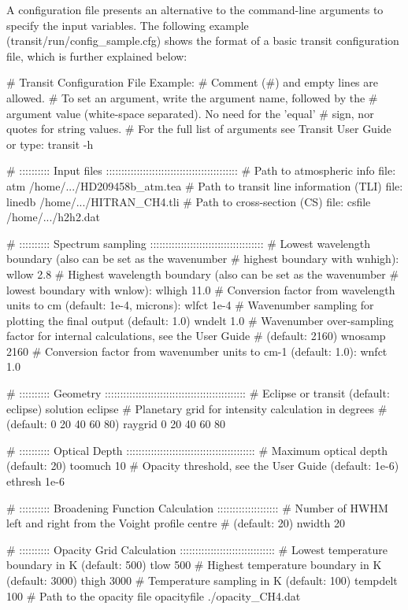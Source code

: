 \documentclass[letterpaper, 12pt]{article}
\begin{document}
A configuration file presents an alternative to the command-line
arguments to specify the input variables.  The following example
({\tttb transit/run/config\_sample.cfg}) shows the format of a basic
transit configuration file, which is further explained below: \newline

\begin{plain}
# Transit Configuration File Example:
# Comment (#) and empty lines are allowed.
# To set an argument, write the argument name, followed by the
#  argument value (white-space separated).  No need for the 'equal'
#  sign, nor quotes for string values.
# For the full list of arguments see Transit User Guide or type: transit -h

# ::::::::::  Input files  :::::::::::::::::::::::::::::::::::::::::::
# Path to atmospheric info file:
atm    /home/.../HD209458b_atm.tea
# Path to transit line information (TLI) file:
linedb /home/.../HITRAN_CH4.tli
# Path to cross-section (CS) file:
csfile /home/.../h2h2.dat

# ::::::::::  Spectrum sampling  :::::::::::::::::::::::::::::::::::::
# Lowest wavelength boundary (also can be set as the wavenumber
#   highest boundary with wnhigh):
wllow   2.8
# Highest wavelength boundary (also can be set as the wavenumber
#   lowest boundary with wnlow):
wlhigh 11.0
# Conversion factor from wavelength units to cm (default: 1e-4, microns):
wlfct  1e-4
# Wavenumber sampling for plotting the final output (default: 1.0) 
wndelt  1.0
# Wavenumber over-sampling factor for internal calculations, see the User Guide
#   (default: 2160)
wnosamp 2160
# Conversion factor from wavenumber units to cm-1 (default: 1.0):
wnfct   1.0

# ::::::::::  Geometry  ::::::::::::::::::::::::::::::::::::::::::::::
# Eclipse or transit (default: eclipse)
solution eclipse
# Planetary grid for intensity calculation in degrees
#   (default: 0 20 40 60 80)
raygrid 0 20 40 60 80

# ::::::::::  Optical Depth ::::::::::::::::::::::::::::::::::::::::::
# Maximum optical depth (default: 20)
toomuch 10
# Opacity threshold, see the User Guide (default: 1e-6)
ethresh 1e-6

# ::::::::::  Broadening Function Calculation  ::::::::::::::::::::
# Number of HWHM left and right from the Voight profile centre
#    (default: 20)
nwidth 20

# ::::::::::  Opacity Grid Calculation :::::::::::::::::::::::::::::::
# Lowest temperature boundary in K (default: 500)
tlow        500
# Highest temperature boundary in K (default: 3000)
thigh      3000
# Temperature sampling in K (default: 100)
tempdelt    100
# Path to the opacity file
opacityfile  ./opacity_CH4.dat


\end{plain}
\end{document}
